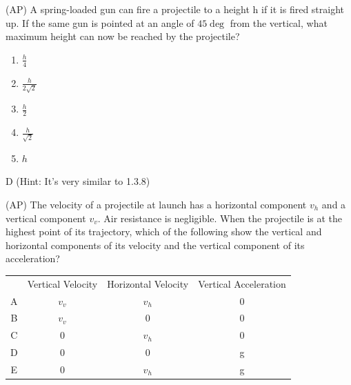 \newpage
\begin{question}
(AP) A spring-loaded gun can fire a projectile to a height h if it is fired straight up. If the same gun is pointed at an angle of $45\deg$ from the vertical, what maximum height can now be reached by the projectile?
\begin{multicols}{5}
\begin{enumerate}[label=(\alph*)]
    \item $\frac{h}{4}$
    \item $\frac{h}{2\sqrt{2}}$
    \item $\frac{h}{2}$
    \item $\frac{h}{\sqrt{2}}$
    \item $h$
\end{enumerate}
\end{multicols}
\end{question}

\begin{solution}
D (Hint: It's very similar to 1.3.8)
\end{solution}


\begin{question}
(AP) The velocity of a projectile at launch has a horizontal component $v_h$ and a vertical component $v_v$. Air resistance is negligible. When the projectile is at the highest point of its trajectory, which of the following show the vertical and horizontal components of its velocity and the vertical component of its acceleration?\\

\begin{tabular}{ |c|c|c|c| } 
 \hline
       & Vertical Velocity & Horizontal Velocity & Vertical Acceleration \\ 
 A     & $v_v$ & $v_h$ & 0\\  
 B     & $v_v$ & 0 & 0\\ 
 C     & 0 & $v_h$ & 0\\ 
 D     & 0 & 0 & g\\ 
 E     & 0 & $v_h$ & g\\ 
 \hline
\end{tabular}\\

\end{question}

